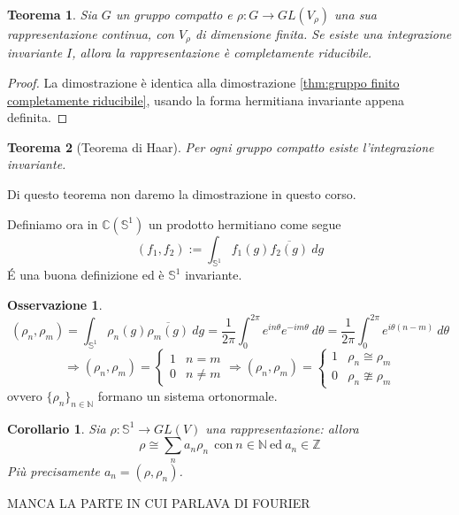 \documentclass[11pt]{article}
\theoremstyle{plain}
\newtheorem{thm}{Teorema}[section]
\newtheorem*{cor}{Corollario}
\theoremstyle{definition}
\newtheorem*{rem}{Osservazione}
\theoremstyle{remark}
\newcommand{\C}{\mathbb{C}}
\newcommand{\Z}{\mathbb{Z}}
\newcommand{\N}{\mathbb{N}}
\newcommand{\dint}{\displaystyle\int}
\begin{document}
\begin{thm} Sia $G$ un gruppo compatto e $\rho : G \to GL(V_\rho)$ una sua rappresentazione continua, con $V_\rho$ di dimensione finita. Se esiste una integrazione invariante $I$, allora la rappresentazione è completamente riducibile.

\end{thm}

\begin{proof}
  La dimostrazione è identica alla dimostrazione \ref{thm:gruppo finito completamente riducibile}, usando la forma hermitiana invariante appena definita. 
\end{proof}


\begin{thm}[Teorema di Haar]
Per ogni gruppo compatto esiste l'integrazione invariante. 
\end{thm}

Di questo teorema non daremo la dimostrazione in questo corso. 

Definiamo ora in $\C(\mathbb{S}^1)$ un prodotto hermitiano come segue
\[(f_1,f_2):=\dint_{\mathbb{S}^1}f_1(g)\overline{f_2(g)}\ dg\]
\'E una buona definizione ed è $\mathbb{S}^1$ invariante.
\begin{rem}
\[(\rho_n,\rho_m)=\dint_{\mathbb{S}^1}\rho_n(g)\overline{\rho_m(g)}\ dg=\frac{1}{2\pi}\dint_0^{2\pi}e^{in\theta}e^{-im\theta}\ d\theta=\frac{1}{2\pi}\dint_0^{2\pi}e^{i\theta (n-m)}\ d\theta \]
\[\Rightarrow (\rho_n,\rho_m)=\left\{\begin{matrix}
1 & n=m\\ 
0 & n\neq m
\end{matrix}\right.\Rightarrow (\rho_n,\rho_m)=\left\{\begin{matrix}
1 & \rho_n\cong \rho_m\\ 
0 & \rho_n \ncong \rho_m
\end{matrix}\right.\]
ovvero $\{\rho_n\}_{n\in \N}$ formano un sistema ortonormale.
\end{rem}
\begin{cor} Sia $\rho: \mathbb{S}^1\rightarrow GL(V)$ una rappresentazione: allora
\[\rho\cong \sum_n a_n\rho_n\ \ \text{con}\ n\in \N\ \text{ed}\ a_n\in \Z\]
Più precisamente $a_n=(\rho,\rho_n)$.
\end{cor}

MANCA LA PARTE IN CUI PARLAVA DI FOURIER
\end{document}
